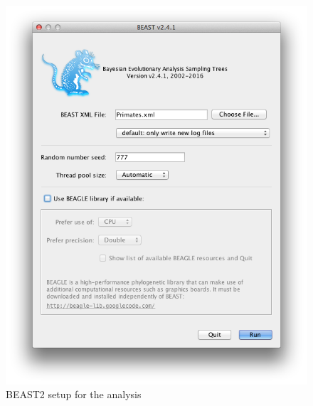 \documentclass[11pt]{article}
\begin{document}
\begin{figure}[H]
\centering
\includegraphics[width=5in]{figures/beast.png}
\caption{\small BEAST2 setup for the analysis}
\label{fig:beast}
\end{figure}
\end{document}
